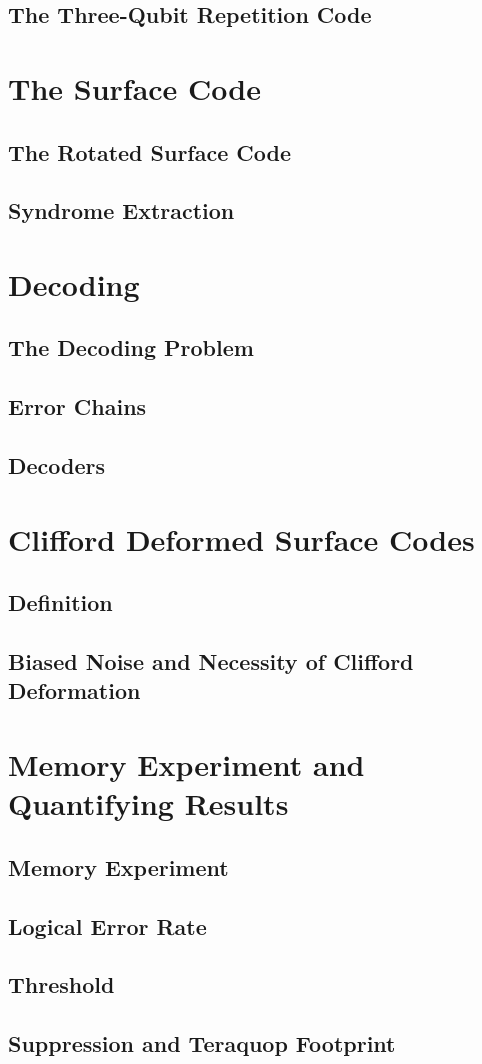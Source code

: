 \subsection{The Three-Qubit Repetition Code}

\section{The Surface Code}
\subsection{The Rotated Surface Code}
\subsection{Syndrome Extraction}

\newpage

\section{Decoding}
\subsection{The Decoding Problem}
\subsection{Error Chains}
\subsection{Decoders}

\section{Clifford Deformed Surface Codes}
\subsection{Definition}
\subsection{Biased Noise and Necessity of Clifford Deformation}

\section{Memory Experiment and Quantifying Results}
\subsection{Memory Experiment}
\subsection{Logical Error Rate}
\subsection{Threshold}
\subsection{Suppression and Teraquop Footprint}
